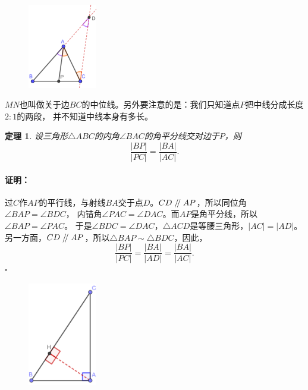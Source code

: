 \documentclass[12pt,UTF8]{ctexbook}
\newtheorem{tm}{定理}[section]
\newenvironment{proof2}{\paragraph{\textbf{证明：}}}{\hfill$\square$}
\renewcommand\parallel{\mathrel{/\mskip-4mu/}}
\begin{document}
\begin{figure} %
    \vspace{-10pt}
    \includegraphics[width=0.27\textwidth]{三角形9.png}
\end{figure}

$MN$也叫做关于边$BC$的中位线。另外要注意的是：我们只知道点$P$把中线分成长度$2:1$的两段，
并不知道中线本身有多长。

\begin{tm}\label{tm:0-2-1}
    设三角形$\triangle ABC$的内角$\angle BAC$的角平分线交对边于$P$，则
    $$ \frac{|BP|}{|PC|} = \frac{|BA|}{|AC|}.$$
\end{tm}
\begin{proof2}
    过$C$作$AP$的平行线，与射线$BA$交于点$D$。$CD \parallel AP$，所以同位角$\angle BAP = \angle BDC$，
    内错角$\angle PAC = \angle DAC$。而$AP$是角平分线，所以$\angle BAP = \angle PAC$。
    于是$\angle BDC = \angle DAC$，$\triangle ACD$是等腰三角形，$|AC| = |AD|$。\\
    另一方面，$CD \parallel AP$，所以$\triangle BAP \sim \triangle BDC$，因此，
    $$\frac{|BP|}{|PC|} = \frac{|BA|}{|AD|} = \frac{|BA|}{|AC|}.$$
\end{proof2}

\begin{figure} %
    \vspace{-80pt}
    \includegraphics[width=0.27\textwidth]{三角形10.png}
\end{figure}
\end{document}
